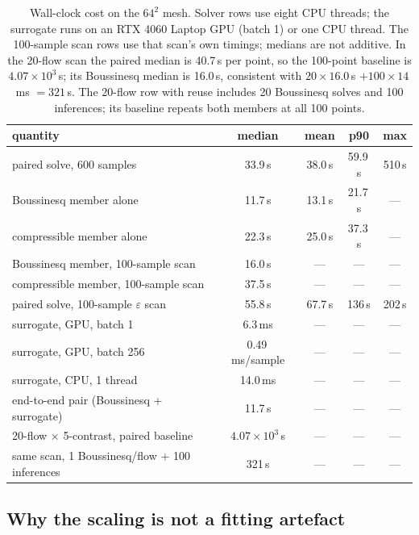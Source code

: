\documentclass[preprint,11pt,a4paper,times]{elsarticle}
\begin{document}
\begin{table}[htbp]
\centering
\caption{Wall-clock cost on the $64^2$ mesh. Solver rows use eight CPU threads; the surrogate
runs on an RTX 4060 Laptop GPU (batch 1) or one CPU thread. The 100-sample scan rows use that
scan's own timings; medians are not additive. In the 20-flow scan the paired median is 40.7\,s
per point, so the 100-point baseline is $4.07\times10^3$\,s; its Boussinesq median is 16.0\,s,
consistent with $20\times16.0$\,s $+100\times14$\,ms $=321$\,s. The 20-flow row with reuse
includes 20 Boussinesq solves and 100 inferences; its baseline repeats both members at all 100
points.}
\label{tab:cost}
\setlength{\tabcolsep}{4pt}
\small
\begin{tabular}{@{}lcccc@{}}
\toprule
quantity & median & mean & p90 & max\\
\midrule
paired solve, 600 samples & 33.9\,s & 38.0\,s & 59.9\,s & 510\,s\\
Boussinesq member alone & 11.7\,s & 13.1\,s & 21.7\,s & ---\\
compressible member alone & 22.3\,s & 25.0\,s & 37.3\,s & ---\\
Boussinesq member, 100-sample scan & 16.0\,s & --- & --- & ---\\
compressible member, 100-sample scan & 37.5\,s & --- & --- & ---\\
paired solve, 100-sample $\varepsilon$ scan & 55.8\,s & 67.7\,s & 136\,s & 202\,s\\
surrogate, GPU, batch 1 & 6.3\,ms & --- & --- & ---\\
surrogate, GPU, batch 256 & 0.49\,ms/sample & --- & --- & ---\\
surrogate, CPU, 1 thread & 14.0\,ms & --- & --- & ---\\
end-to-end pair (Boussinesq + surrogate) & 11.7\,s & --- & --- & ---\\
20-flow $\times$ 5-contrast, paired baseline & $4.07\times10^3$\,s & --- & --- & ---\\
same scan, 1 Boussinesq/flow + 100 inferences & 321\,s & --- & --- & ---\\
\bottomrule
\end{tabular}
\end{table}

\subsection{Why the scaling is not a fitting artefact}
\label{sec:baselines}
\label{sec:checks}
\end{document}
